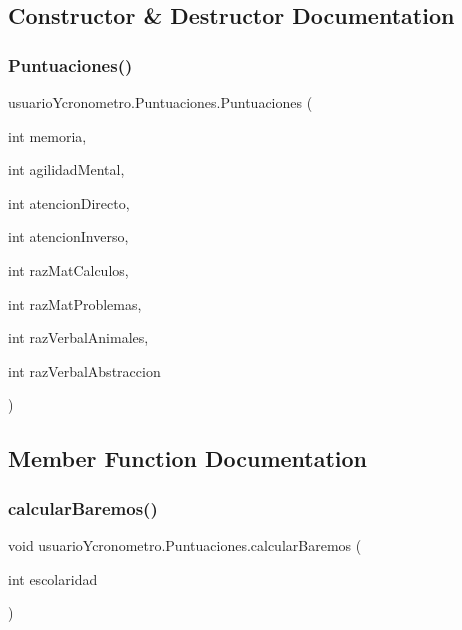 \subsection{Constructor \& Destructor Documentation}
\mbox{\label{classusuario_ycronometro_1_1_puntuaciones_ab9b472fcb079cdeb1530c335e5e56ddc}} 
\subsubsection{\texorpdfstring{Puntuaciones()}{Puntuaciones()}}
{\footnotesize\ttfamily usuario\+Ycronometro.\+Puntuaciones.\+Puntuaciones (\begin{DoxyParamCaption}\item[{int}]{memoria,  }\item[{int}]{agilidad\+Mental,  }\item[{int}]{atencion\+Directo,  }\item[{int}]{atencion\+Inverso,  }\item[{int}]{raz\+Mat\+Calculos,  }\item[{int}]{raz\+Mat\+Problemas,  }\item[{int}]{raz\+Verbal\+Animales,  }\item[{int}]{raz\+Verbal\+Abstraccion }\end{DoxyParamCaption})}



\subsection{Member Function Documentation}
\mbox{\label{classusuario_ycronometro_1_1_puntuaciones_a9ed35a7af083dda792147918af3f643d}} 
\subsubsection{\texorpdfstring{calcular\+Baremos()}{calcularBaremos()}}
{\footnotesize\ttfamily void usuario\+Ycronometro.\+Puntuaciones.\+calcular\+Baremos (\begin{DoxyParamCaption}\item[{int}]{escolaridad }\end{DoxyParamCaption})}

